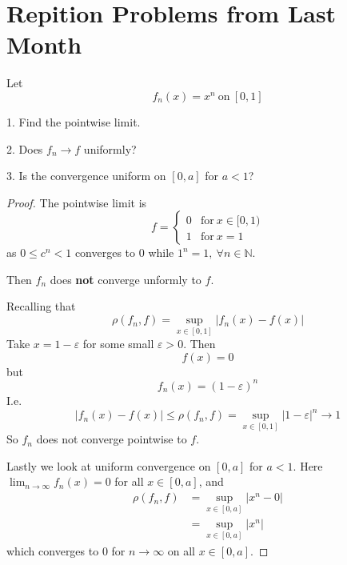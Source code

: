 \section{Repition Problems from Last Month}
\begin{prob}
    Let 
    \[
        f_n(x) = x^n \ \text{on} \ [0,1]
    \]

    1. Find the pointwise limit. 

    2. Does $f_n \to f$ uniformly? 

    3. Is the convergence uniform on $[0,a]$ for $a < 1$?
\end{prob}
\begin{proof}
    The pointwise limit is 
    \[
        f = 
        \begin{cases}
            0 & \text{for} \ x\in [0,1) \\ 
            1 & \text{for} \ x = 1
        \end{cases}
    \]
    as $0 \leq c^n < 1$ converges to $0$ while 
    $1^n = 1, \ \forall n \in \mathbb N$.

    Then $f_n$ does \textbf{not} converge unformly to 
    $f$. 

    Recalling that 
    \[
        \rho(f_n,f) = \sup_{x\in[0,1]}|f_n(x) - f(x)|
    \]
    Take $x = 1 - \varepsilon$ for some small $\varepsilon > 0$. 
    Then 
    \[
        f(x) = 0
    \]
    but 
    \[
        f_n(x) = (1-\varepsilon)^n
    \]
    I.e. 
    \[
        |f_n(x) - f(x)| \leq \rho(f_n,f) = 
        \sup_{x\in[0,1]}|1-\varepsilon|^n \to 1
    \]
    So $f_n$ does not converge pointwise to $f$.

    Lastly we look at uniform convergence on $[0,a]$ for 
    $a < 1$. Here $\lim_{n\to\infty}f_n(x) = 0$ for all 
    $x \in [0,a]$, and 
    \begin{align*}
        \rho(f_n,f) &= \sup_{x\in[0,a]}|x^n - 0| \\ 
                    &= \sup_{x\in[0,a]}|x^n| 
    \end{align*}
    which converges to $0$ for $n \to \infty$ on all $x \in [0,a]$.
\end{proof}

